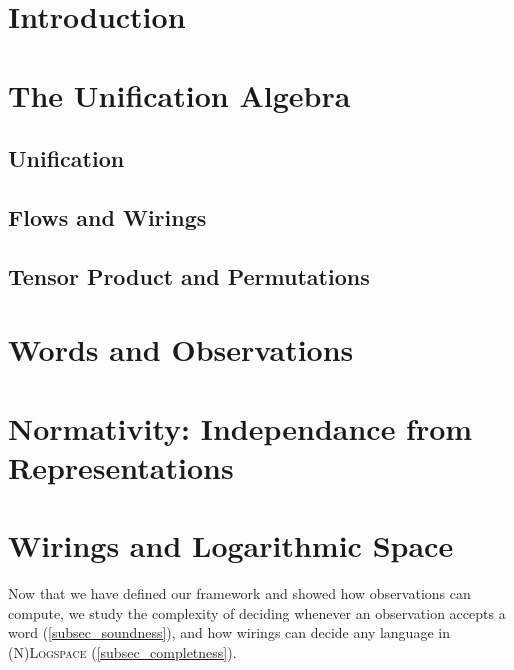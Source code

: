 
\section*{Introduction}


\section{The Unification Algebra}\label{sec_unification}
	\subsection{Unification}
	
	\subsection{Flows and Wirings}
	
	\subsection{Tensor Product and Permutations}\label{permutation}
	

\section{Words and Observations}\label{sec_words}
	
	
	
\section{Normativity: Independance from Representations}\label{sec_normativity}
	

\section{Wirings and Logarithmic Space}\label{sec_logspace}
	Now that we have defined our framework and showed how observations can compute, we study the complexity of deciding whenever an observation accepts a word (\ref{subsec_soundness}), and how wirings can decide any language in \textsc{(N)Logspace} (\ref{subsec_completness}).
